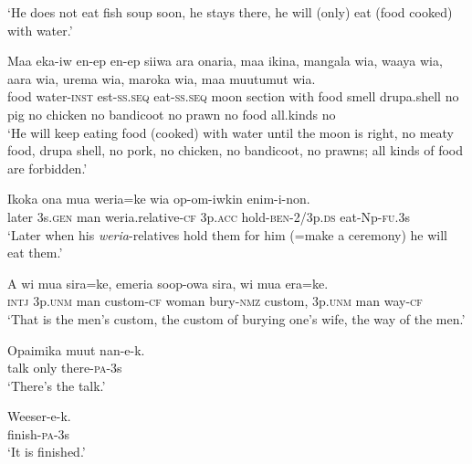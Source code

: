 \glt ‘He does not eat fish soup soon, he stays there, he will (only) eat (food cooked) with water.’ \\
\z


\ea\label{ex:a:x37}
\gll  Maa  eka-iw  en-ep  en-ep  siiwa  ara  onaria,  maa  ikina,          mangala  wia,  waaya  wia,  aara  wia,  urema  wia,  maroka  wia, maa  muutumut  wia. \\
food  water-\textsc{inst}  est-\textsc{ss.seq}  eat-\textsc{ss.seq}  moon  section  with  food  smell drupa.shell  no  pig  no  chicken  no  bandicoot  no  prawn  no   food  all.kinds  no \\




\glt ‘He will keep eating food (cooked) with water until the moon is right, no meaty food, drupa shell, no pork, no chicken, no bandicoot, no prawns; all kinds of food are forbidden.’ \\
\z


\ea\label{ex:a:x38}
\gll  Ikoka  ona  mua  weria=ke  wia  op-om-iwkin  enim-i-non. \\
later  3s.\textsc{gen}  man  weria.relative-\textsc{cf}  3p.\textsc{acc}  hold-\textsc{ben}-2/3p.\textsc{ds}  eat-Np-\textsc{fu}.3s \\
\glt ‘Later when his \textit{weria}{}-relatives hold them for him (=make a ceremony) he will eat them.’ \\
\z


\ea\label{ex:a:x39}
\gll  A  wi  mua  sira=ke,  emeria  soop-owa  sira,  wi  mua        era=ke. \\
\textsc{intj}  3p.\textsc{unm}  man  custom-\textsc{cf}  woman  bury-\textsc{nmz}  custom,  3p.\textsc{unm}  man way-\textsc{cf} \\


\glt ‘That is the men’s custom, the custom of burying one’s wife, the way of the men.’ \\
\z


\ea\label{ex:a:x40}
\gll  Opaimika  muut  nan-e-k. \\
talk  only  there-\textsc{pa}-3s \\
\glt ‘There’s the talk.’ \\
\z


\ea\label{ex:a:x41}
\gll  Weeser-e-k. \\
finish-\textsc{pa}-3s \\
\glt ‘It is finished.’ \\
\z


